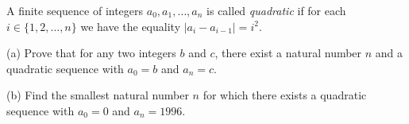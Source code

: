 A finite sequence of integers $a_0, a_1, \ldots, a_n$ is called \emph{quadratic} if for each $i \in \{1, 2, \ldots, n\}$ we have the equality $|a_i - a_{i-1}| = i^2$.

(a) Prove that for any two integers $b$ and $c$, there exist a natural number $n$ and a quadratic sequence with $a_0 = b$ and $a_n = c$.

(b) Find the smallest natural number $n$ for which there exists a quadratic sequence with $a_0 = 0$ and $a_n = 1996$.
